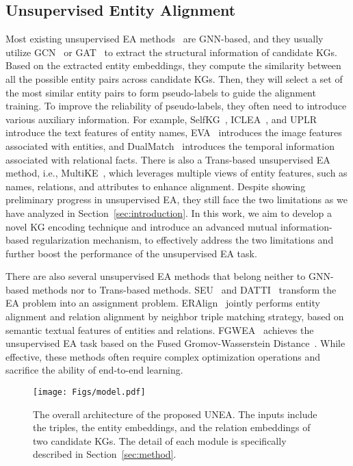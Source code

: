 \subsection{Unsupervised Entity Alignment}
Most existing unsupervised EA methods~\cite{eva, selfkg, uplr, dualmatch, iclea, emgcn} are GNN-based, and they usually utilize GCN~\cite{gcn} or GAT~\cite{gat} to extract the structural information of candidate KGs. Based on the extracted entity embeddings, they compute the similarity between all the possible entity pairs across candidate KGs. Then, they will select a set of the most similar entity pairs to form pseudo-labels to guide the alignment training. To improve the reliability of pseudo-labels, they often need to introduce various auxiliary information. For example, SelfKG~\cite{selfkg}, ICLEA~\cite{iclea}, and UPLR~\cite{uplr} introduce the text features of entity names, EVA~\cite{eva} introduces the image features associated with entities, and DualMatch~\cite{dualmatch} introduces the temporal information associated with relational facts. There is also a Trans-based unsupervised EA method, i.e., MultiKE~\cite{multike}, which leverages multiple views of entity features, such as names, relations, and attributes to enhance alignment. Despite showing preliminary progress in unsupervised EA, they still face the two limitations as we have analyzed in Section~\ref{sec:introduction}. In this work, we aim to develop a novel KG encoding technique and introduce an advanced mutual information-based regularization mechanism, to effectively address the two limitations and further boost the performance of the unsupervised EA task. 

There are also several unsupervised EA methods that belong neither to GNN-based methods nor to Trans-based methods. SEU~\cite{seu} and DATTI~\cite{datti} transform the EA problem into an assignment problem. ERAlign~\cite{eralign} jointly performs entity alignment and relation alignment by neighbor triple matching strategy, based on semantic textual features of entities and relations. FGWEA~\cite{fgwea} achieves the unsupervised EA task based on the Fused Gromov-Wasserstein Distance~\cite{fgw}. While effective, these methods often require complex optimization operations and sacrifice the ability of end-to-end learning.



\begin{figure*}[ht]
\centering
\texttt{[image: Figs/model.pdf]}
\caption{The overall architecture of the proposed UNEA. The inputs include the triples, the entity embeddings, and the relation embeddings of two candidate KGs. The detail of each module is specifically described in Section~\ref{sec:method}.}
\label{fig:overview}
\end{figure*}